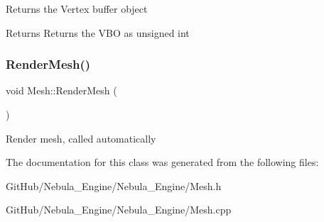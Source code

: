 Returns the Vertex buffer object \begin{DoxyReturn}{Returns}
Returns the V\+BO as unsigned int 
\end{DoxyReturn}
\mbox{\label{class_mesh_a75ccdfd3c16df862abb90d6046abcdb4}} 
\subsubsection{\texorpdfstring{RenderMesh()}{RenderMesh()}}
{\footnotesize\ttfamily void Mesh\+::\+Render\+Mesh (\begin{DoxyParamCaption}{ }\end{DoxyParamCaption})}

Render mesh, called automatically 

The documentation for this class was generated from the following files\+:\begin{DoxyCompactItemize}
\item 
Git\+Hub/\+Nebula\+\_\+\+Engine/\+Nebula\+\_\+\+Engine/Mesh.\+h\item 
Git\+Hub/\+Nebula\+\_\+\+Engine/\+Nebula\+\_\+\+Engine/Mesh.\+cpp\end{DoxyCompactItemize}
